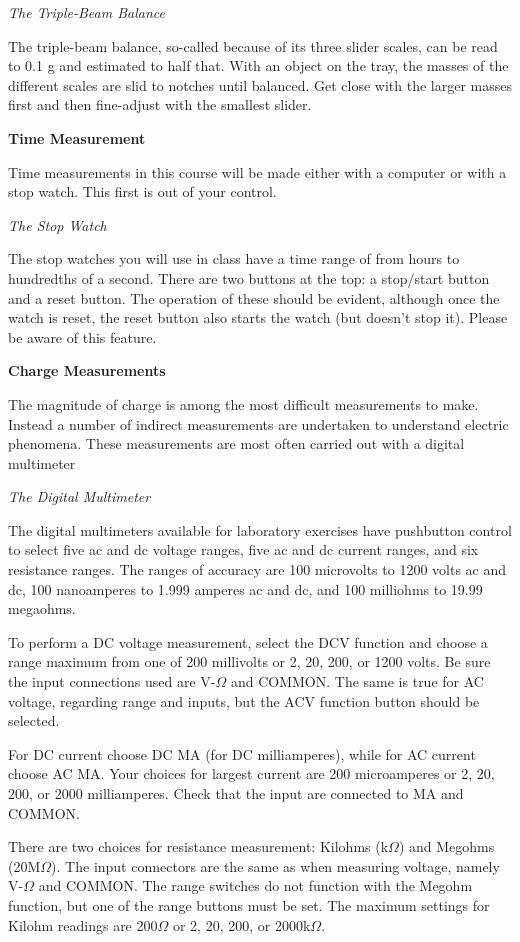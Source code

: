\textit{The Triple-Beam Balance}

The triple-beam balance, so-called because of its three slider scales, can be read to 0.1 g and estimated to half that. With an object on the tray, the masses of the different scales are slid to notches until balanced. Get close with the larger masses first and then fine-adjust with the smallest slider.

\textbf{Time Measurement}

Time measurements in this course will be made either with a computer or with a stop watch. This first is out of your control.

\textit{The Stop Watch}

The stop watches you will use in class have a time range of from hours to hundredths of a second. There are two buttons at the top: a stop/start button and a reset button. The operation of these should be evident, although once the watch is reset, the reset button also starts the watch (but doesn't stop it). Please be aware of this feature.

\textbf{Charge Measurements}

The magnitude of charge is among the most difficult measurements to make. Instead a number of indirect measurements are undertaken to understand electric phenomena. These measurements are most often carried out with a digital multimeter

\textit{The Digital Multimeter}

The digital multimeters available for laboratory exercises have pushbutton control to select five ac and dc voltage ranges, five ac and dc current ranges, and six resistance ranges. The ranges of accuracy are 100 microvolts to 1200 volts ac and dc, 100 nanoamperes to 1.999 amperes ac and dc, and 100 milliohms to 19.99 megaohms.

To perform a DC voltage measurement, select the DCV function and choose a range maximum from one of 200 millivolts or 2, 20, 200, or 1200 volts. Be sure the input connections used are V-$\Omega$ and COMMON. The same is true for AC voltage, regarding range and inputs, but the ACV function button should be selected.

For DC current choose DC MA (for DC milliamperes), while for AC current choose AC MA. Your choices for largest current are 200 microamperes or 2, 20, 200, or 2000 milliamperes. Check that the input are connected to MA and COMMON.

There are two choices for resistance measurement: Kilohms (k$\Omega$) and Megohms (20M$\Omega$). The input connectors are the same as when measuring voltage, namely V-$\Omega$ and COMMON. The range switches do not function with the Megohm function, but one of the range buttons must be set. The maximum settings for Kilohm readings are 200$\Omega$ or 2, 20, 200, or 2000k$\Omega$.

